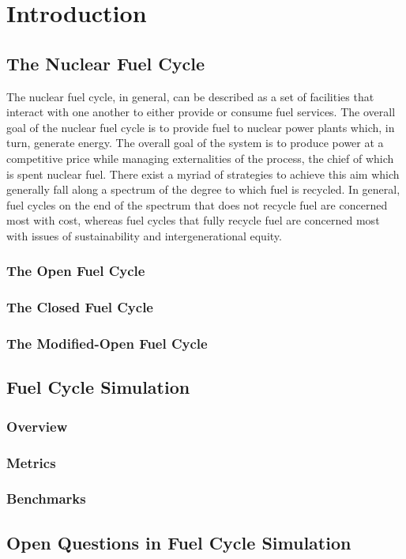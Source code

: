 \chapter{Introduction}\label{ch:intro}

\section{The Nuclear Fuel Cycle}

The nuclear fuel cycle, in general, can be described as a set of facilities that
interact with one another to either provide or consume fuel services. The
overall goal of the nuclear fuel cycle is to provide fuel to nuclear power
plants which, in turn, generate energy. The overall goal of the system is to
produce power at a competitive price while managing externalities of the
process, the chief of which is spent nuclear fuel. There exist a myriad of
strategies to achieve this aim which generally fall along a spectrum of the
degree to which fuel is recycled. In general, fuel cycles on the end of the
spectrum that does not recycle fuel are concerned most with cost, whereas fuel
cycles that fully recycle fuel are concerned most with issues of sustainability
and intergenerational equity.

\subsection{The Open Fuel Cycle}


\subsection{The Closed Fuel Cycle}


\subsection{The Modified-Open Fuel Cycle}


\section{Fuel Cycle Simulation}

\subsection{Overview}\label{sec:simulators-overview}


\subsection{Metrics}


\subsection{Benchmarks}


\section{Open Questions in Fuel Cycle Simulation}

